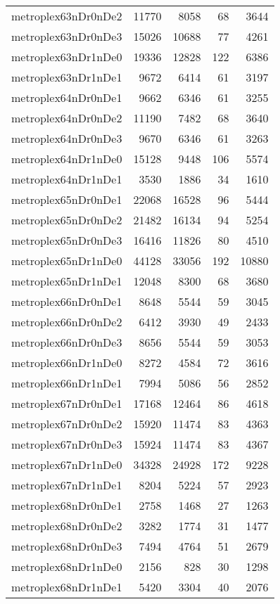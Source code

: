 \begin{tabular}{lrrrr}
metroplex63nDr0nDe2 & 11770 & 8058 & 68 & 3644 \\
metroplex63nDr0nDe3 & 15026 & 10688 & 77 & 4261 \\
metroplex63nDr1nDe0 & 19336 & 12828 & 122 & 6386 \\
metroplex63nDr1nDe1 & 9672 & 6414 & 61 & 3197 \\
metroplex64nDr0nDe1 & 9662 & 6346 & 61 & 3255 \\
metroplex64nDr0nDe2 & 11190 & 7482 & 68 & 3640 \\
metroplex64nDr0nDe3 & 9670 & 6346 & 61 & 3263 \\
metroplex64nDr1nDe0 & 15128 & 9448 & 106 & 5574 \\
metroplex64nDr1nDe1 & 3530 & 1886 & 34 & 1610 \\
metroplex65nDr0nDe1 & 22068 & 16528 & 96 & 5444 \\
metroplex65nDr0nDe2 & 21482 & 16134 & 94 & 5254 \\
metroplex65nDr0nDe3 & 16416 & 11826 & 80 & 4510 \\
metroplex65nDr1nDe0 & 44128 & 33056 & 192 & 10880 \\
metroplex65nDr1nDe1 & 12048 & 8300 & 68 & 3680 \\
metroplex66nDr0nDe1 & 8648 & 5544 & 59 & 3045 \\
metroplex66nDr0nDe2 & 6412 & 3930 & 49 & 2433 \\
metroplex66nDr0nDe3 & 8656 & 5544 & 59 & 3053 \\
metroplex66nDr1nDe0 & 8272 & 4584 & 72 & 3616 \\
metroplex66nDr1nDe1 & 7994 & 5086 & 56 & 2852 \\
metroplex67nDr0nDe1 & 17168 & 12464 & 86 & 4618 \\
metroplex67nDr0nDe2 & 15920 & 11474 & 83 & 4363 \\
metroplex67nDr0nDe3 & 15924 & 11474 & 83 & 4367 \\
metroplex67nDr1nDe0 & 34328 & 24928 & 172 & 9228 \\
metroplex67nDr1nDe1 & 8204 & 5224 & 57 & 2923 \\
metroplex68nDr0nDe1 & 2758 & 1468 & 27 & 1263 \\
metroplex68nDr0nDe2 & 3282 & 1774 & 31 & 1477 \\
metroplex68nDr0nDe3 & 7494 & 4764 & 51 & 2679 \\
metroplex68nDr1nDe0 & 2156 & 828 & 30 & 1298 \\
metroplex68nDr1nDe1 & 5420 & 3304 & 40 & 2076 \\

\end{tabular}
